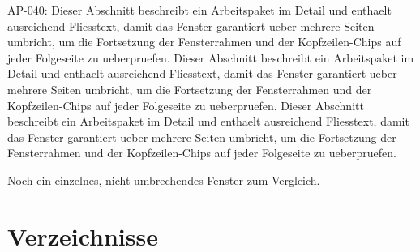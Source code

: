 \documentclass[type=report,theme=light,language=de]{semio}
\begin{document}
\begin{Table}[title=Lange Tabelle]
AP-040: Dieser Abschnitt beschreibt ein Arbeitspaket im Detail und enthaelt ausreichend Fliesstext, damit das Fenster garantiert ueber mehrere Seiten umbricht, um die Fortsetzung der Fensterrahmen und der Kopfzeilen-Chips auf jeder Folgeseite zu ueberpruefen. Dieser Abschnitt beschreibt ein Arbeitspaket im Detail und enthaelt ausreichend Fliesstext, damit das Fenster garantiert ueber mehrere Seiten umbricht, um die Fortsetzung der Fensterrahmen und der Kopfzeilen-Chips auf jeder Folgeseite zu ueberpruefen. Dieser Abschnitt beschreibt ein Arbeitspaket im Detail und enthaelt ausreichend Fliesstext, damit das Fenster garantiert ueber mehrere Seiten umbricht, um die Fortsetzung der Fensterrahmen und der Kopfzeilen-Chips auf jeder Folgeseite zu ueberpruefen. 
\end{Table}

\begin{Figure}[title=Andere Kurze Figur]
  Noch ein einzelnes, nicht umbrechendes Fenster zum Vergleich.
\end{Figure}

\appendix
\chapter{Verzeichnisse}
\makeregisters
\end{document}
